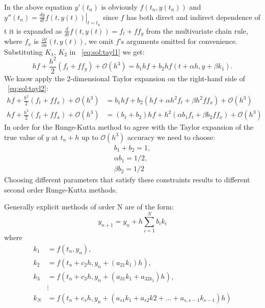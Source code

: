 \documentclass[11pt]{article}
\begin{document}
    In the above equation $y'(t_n)$ is obviously $f(t_n, y(t_n))$ and
    $y''(t_n) = \left. \frac{dy}{dt} f(t, y(t)) \right|_{t=t_n}$ since $f$ has both direct and indirect dependence of t
    it is expanded as $\frac{d}{dt} f(t, y(t)) = f_{t} + ff_{y}$  from the multivariate chain rule, where $f_x$ is
    $\frac{\partial f}{\partial x}(t, y(t))$, we omit $f$'s arguments omitted for convenience.
    Substituting $K_1$, $K_2$ in ~\eqref{eq:sol:tayl1} we get:
    \begin{equation*}
        hf + \frac{h^{2}}{2}(f_{t} + ff_{y}) + \mathcal{O}\left(h^{3}\right)
        =
        b_{1}hf + b_{2}hf(t + \alpha h, y + \beta k_{1}).
        \label{eq:sol:tayl2}
    \end{equation*}
    We know apply the 2-dimensional Taylor expansion on the right-hand side of ~\eqref{eq:sol:tayl2}:
    \begin{align*}
        hf + \frac{h^{2}}{2}(f_{t} + ff_{x}) + \mathcal{O}\left(h^{3}\right)  &=
        b_{1}hf + b_{2}(hf +\alpha h^{2}f_{t} + \beta h^{2} ff_{x}) + \mathcal{O}\left(h^{3}\right)
        \\
        hf + \frac{h^{2}}{2}(f_{t} + ff_{x}) + \mathcal{O}\left(h^{3}\right)  &=
        (b_{1} + b_{2})hf + h^2 (\alpha b_1 f_{t} + \beta b_2 ff_{x}) + \mathcal{O}\left(h^{3}\right)
    \end{align*}
    In order for the Runge-Kutta method to agree with the Taylor expansion of the true value of $y$ at $t_n + h$ up to
    $\mathcal{O}(h^3)$ accuracy we need to choose:
    \begin{align*}
        b_1 + b_2 = 1, \\
        \alpha b_1 = 1/2, \\
        \beta b_2 = 1/2
    \end{align*}
    Choosing different parameters that satisfy these constraints results to different second order Runge-Kutta methods.

    Generally explicit methods of order N are of the form:
    \begin{equation*}
        y_{n+1} = y_n + h \sum_{i=1}^{N} b_i k_i
    \end{equation*}
    where
    \begin{align}
        k_1 &= f(t_n, y_n), \\
        k_2 &= f(t_n + c_2 h, y_n + (a_{21} k_1) h), \\
        k_3 &= f(t_n + c_3 h, y_n + (a_{31} k_1 + a_{32 k_2})h), \\
        &\vdots \\
        k_N &= f(t_n + c_s h, y_n + (a_{s1}k_1 + a_{s2}k2 + \dots + a_{s, s-1}k_{s-1})h)
    \end{align}
\end{document}
